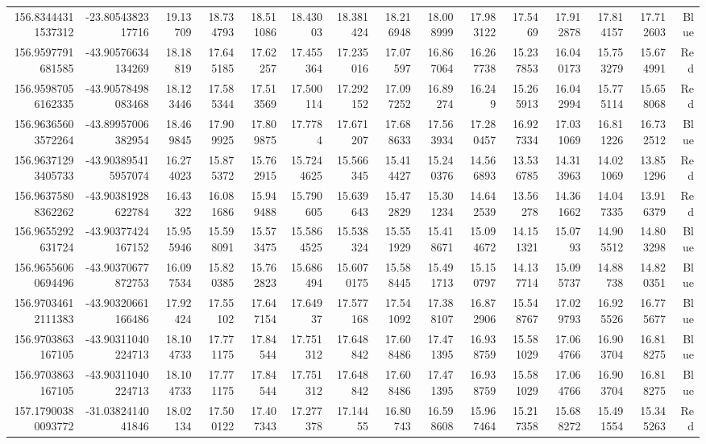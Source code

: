 \begin{center}
\begin{longtable}{rrrrrrrrrrrrrrr}
156.83444311537312 & -23.8054382317716 & 19.13709 & 18.734793 & 18.511086 & 18.43003 & 18.381424 & 18.216948 & 18.008999 & 17.983122 & 17.5469 & 17.912878 & 17.814157 & 17.712603 & Blue \\
156.9597791681585 & -43.90576634134269 & 18.18819 & 17.645185 & 17.62257 & 17.455364 & 17.235016 & 17.07597 & 16.867064 & 16.267738 & 15.237853 & 16.040173 & 15.753279 & 15.674991 & Red \\
156.95987056162335 & -43.90578498083468 & 18.123446 & 17.585344 & 17.513569 & 17.500114 & 17.292152 & 17.097252 & 16.89274 & 16.249 & 15.265913 & 16.042994 & 15.775114 & 15.658068 & Red \\
156.96365603572264 & -43.89957006382954 & 18.469845 & 17.909925 & 17.809875 & 17.7784 & 17.671207 & 17.688633 & 17.563934 & 17.280457 & 16.927334 & 17.031069 & 16.811226 & 16.732512 & Blue \\
156.96371293405733 & -43.903895415957074 & 16.274023 & 15.875372 & 15.762915 & 15.7244625 & 15.566345 & 15.414427 & 15.240376 & 14.566893 & 13.536785 & 14.313963 & 14.021069 & 13.851296 & Red \\
156.96375808362262 & -43.90381928622784 & 16.43322 & 16.081686 & 15.949488 & 15.790605 & 15.639643 & 15.472829 & 15.301234 & 14.642539 & 13.56278 & 14.361662 & 14.047335 & 13.916379 & Red \\
156.9655292631724 & -43.90377424167152 & 15.955946 & 15.598091 & 15.573475 & 15.5864525 & 15.538324 & 15.551929 & 15.418671 & 15.094672 & 14.151321 & 15.0793 & 14.905512 & 14.803298 & Blue \\
156.96556060694496 & -43.90370677872753 & 16.097534 & 15.820385 & 15.762823 & 15.686494 & 15.6070175 & 15.588445 & 15.491713 & 15.150797 & 14.137714 & 15.095737 & 14.88738 & 14.820351 & Blue \\
156.97034612111383 & -43.90320661166486 & 17.92424 & 17.55102 & 17.647154 & 17.64937 & 17.577168 & 17.541092 & 17.388107 & 16.872906 & 15.548767 & 17.029793 & 16.925526 & 16.775677 & Blue \\
156.9703863167105 & -43.90311040224713 & 18.104733 & 17.771175 & 17.84544 & 17.751312 & 17.648842 & 17.608486 & 17.471395 & 16.938759 & 15.581029 & 17.064766 & 16.903704 & 16.818275 & Blue \\
156.9703863167105 & -43.90311040224713 & 18.104733 & 17.771175 & 17.84544 & 17.751312 & 17.648842 & 17.608486 & 17.471395 & 16.938759 & 15.581029 & 17.064766 & 16.903704 & 16.818275 & Blue \\
157.17900380093772 & -31.0382414041846 & 18.02134 & 17.500122 & 17.407343 & 17.277378 & 17.14455 & 16.80743 & 16.598608 & 15.967464 & 15.217358 & 15.688272 & 15.491554 & 15.345263 & Red \\

\end{longtable}
\end{center}
